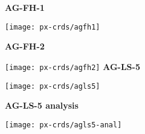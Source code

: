 \documentclass[12pt]{article}
\begin{document}

\hfill{\bf AG-FH-1}\hfill\ 

\texttt{[image: px-crds/agfh1]}%

\newpage
\hfill{\bf AG-FH-2}\hfill\ 

\texttt{[image: px-crds/agfh2]}%
\newpage
\hfill{\bf AG-LS-5}\hfill\ 

\texttt{[image: px-crds/agls5]}%

\newpage
\hfill{\bf AG-LS-5 analysis}\hfill\ 

\texttt{[image: px-crds/agls5-anal]}%
\end{document}

